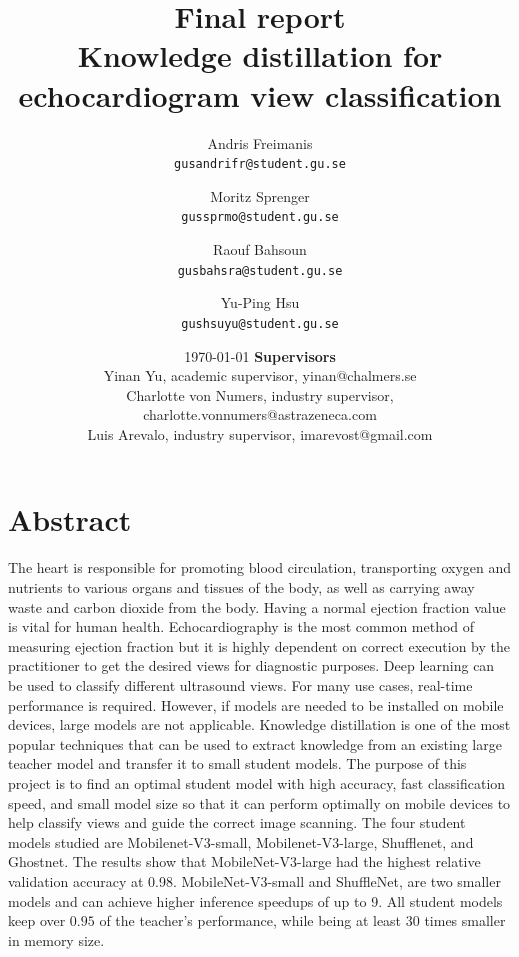 \documentclass[11pt]{article}
\title{Final report \\ Knowledge distillation for echocardiogram view classification}
\author{
  Andris Freimanis\\
  \texttt{gusandrifr@student.gu.se}
  \and
  Moritz Sprenger\\
  \texttt{gussprmo@student.gu.se}
  \and
  Raouf Bahsoun\\
  \texttt{gusbahsra@student.gu.se}
  \and
  Yu-Ping Hsu\\
  \texttt{gushsuyu@student.gu.se}
}
\date{\today \endgraf\bigskip\vspace*{12cm}
	\textbf{Supervisors}\\
	\centering Yinan Yu, academic supervisor, yinan@chalmers.se \\
	Charlotte von Numers, industry supervisor, charlotte.vonnumers@astrazeneca.com \\
	Luis Arevalo, industry supervisor, imarevost@gmail.com}
\begin{document}
\maketitle

\newpage
\tableofcontents
\newpage
\section{Abstract}

The heart is responsible for promoting blood circulation, transporting oxygen and nutrients to various organs and tissues of the body, as well as carrying away waste and carbon dioxide from the body. Having a normal ejection fraction value is vital for human health. Echocardiography is the most common method of measuring ejection fraction but it is highly dependent on correct execution by the practitioner to get the desired views for diagnostic purposes. Deep learning can be used to classify different ultrasound views. For many use cases, real-time performance is required. However, if models are needed to be installed on mobile devices, large models are not applicable. Knowledge distillation is one of the most popular techniques that can be used to extract knowledge from an existing large teacher model and transfer it to small student models. The purpose of this project is to find an optimal student model with high accuracy, fast classification speed, and small model size so that it can perform optimally on mobile devices to help classify views and guide the correct image scanning. The four student models studied are Mobilenet-V3-small, Mobilenet-V3-large, Shufflenet, and Ghostnet. The results show that MobileNet-V3-large had the highest relative validation accuracy at 0.98. MobileNet-V3-small and ShuffleNet, are two smaller models and can achieve higher inference speedups of up to 9. All student models keep over $ 0.95 $ of the teacher's performance, while being at least $ 30 $ times smaller in memory size.
\end{document}
